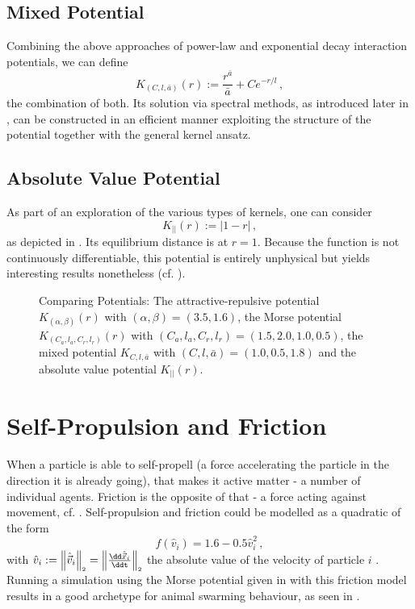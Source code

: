 \subsection{Mixed Potential}
Combining the above approaches of power-law and exponential decay interaction potentials, we can define
\begin{equation}
  K_{(C, l, \bar{a})}(r) := \frac{r^{\bar{a}}}{\bar{a}} + C e^{-r/l}\,,
  \label{eq:mixed-potential}
\end{equation}
the combination of both.
Its solution via spectral methods, as introduced later in , can be constructed in an efficient manner exploiting the structure of the potential together with the general kernel ansatz.

\subsection{Absolute Value Potential}
As part of an exploration of the various types of kernels, one can consider
\begin{equation}
  K_{||}(r) := |1-r|\,,
  \label{eq:absvalue-potential}
\end{equation}
as depicted in .
Its equilibrium distance is at $r = 1$.
Because the function is not continuously differentiable, this potential is entirely unphysical but yields interesting results nonetheless (cf. ).

\begin{figure}[H]
  \centering
  \caption[Comparing potentials]{Comparing Potentials: The attractive-repulsive potential $K_{(\alpha,\beta)}(r)$ with $(\alpha,\beta) = (3.5, 1.6)$, the Morse potential $K_{(C_a, l_a, C_r, l_r)}(r)$ with $(C_a, l_a, C_r, l_r) = (1.5, 2.0, 1.0, 0.5)$, the mixed potential $K_{C, l, \bar{a}}$ with $(C, l, \bar{a}) = (1.0, 0.5, 1.8)$ and the absolute value potential $K_{||}(r)$.}
  \label{fig:comparing-potentials}
\end{figure}

\section{Self-Propulsion and Friction}
\label{sec:self-propulsion-friction}
When a particle is able to self-propell (a force accelerating the particle in the direction it is already going), that makes it active matter - a number of individual agents.
Friction is the opposite of that - a force acting against movement, cf. .
Self-propulsion and friction could be modelled as a quadratic of the form
$$f(\hat{v}_i) = 1.6 - 0.5 \hat{v}_i^2\,,$$
with $\hat{v}_i := \norm{\hatvec{v}_i} = \norm{\frac{\dd\hatvec{x}_i}{\ddt}}$ the absolute value of the velocity of particle $i$ \parencite{2006-self-propelled}.
Running a simulation using the Morse potential given in  with this friction model results in a good archetype for animal swarming behaviour, as seen in .

